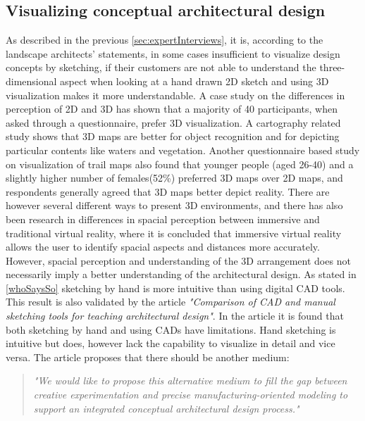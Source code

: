 			\subsection{Visualizing conceptual architectural design}
			\label{sec:immersion}
			As described in the previous \autoref{sec:expertInterviews}, it is, according to the landscape architects' statements, in some cases insufficient to visualize design concepts by sketching, if their customers are not able to understand the three-dimensional aspect when looking at a hand drawn 2D sketch and using 3D visualization makes it more understandable. A case study on the differences in perception of 2D and 3D\cite{2Dvs3D} has shown that a majority of 40 participants, when asked through a  questionnaire, prefer 3D visualization. A cartography related study shows that 3D maps are better for object recognition and for depicting particular contents like waters and vegetation\cite{2Dvs3DobjectRecognition}. Another questionnaire based study on visualization of trail maps also found that younger people (aged 26-40) and a slightly higher number of females(52\%) preferred 3D maps over 2D maps\cite{2Dvs3DtrailMaps}, and respondents generally agreed that 3D maps better depict reality. There are however several different ways to present 3D environments, and there has also been research in differences in spacial perception between immersive and traditional virtual reality\cite{immersive3DModel}, where it is concluded that immersive virtual reality allows the user to identify spacial aspects and distances more accurately. However, spacial perception and understanding of the 3D arrangement does not necessarily imply a better understanding of the architectural design. As stated in \autoref{whoSaysSo} sketching by hand is more intuitive than using digital CAD tools. This result is also validated by the article \textit{"Comparison of CAD and manual sketching tools for teaching architectural design"}\cite{sketchingVsCAD}. In the article it is found that both sketching by hand and using CADs have limitations. Hand sketching is intuitive but does, however lack the capability to visualize in detail and vice versa. The article proposes that there should be another medium:\\
			
			\begin{quote}
				\textit{"We would like to propose this alternative medium to fill the gap between creative experimentation and precise manufacturing-oriented modeling to support an integrated conceptual architectural design process."}\cite{sketchingVsCAD}\label{proposalForMedium}\\
			\end{quote}

